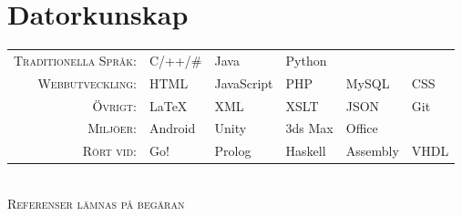 \documentclass[a4paper,10pt]{article}
\begin{document}
\section{Datorkunskap}
\def\arraystretch{1.2}%
\begin{tabu}to \textwidth{r X[c] X[c] X[c] X[c] X[c]}
\textsc{Traditionella Språk:}	&	C/++/\#	&	 Java		&	Python	&			&		\\
\textsc{Webbutveckling:}		&	 HTML		& 	JavaScript	&	PHP		&	MySQL	& 	CSS	\\
\textsc{Övrigt:}			& 	LaTeX		&	XML		&	XSLT		&	JSON		&	 Git	\\
\textsc{Miljöer:}			&	Android	& 	Unity		&	3ds Max	&	Office		&		\\
\textsc{Rört vid: }			&	Go!		&	 Prolog	&	Haskell	&	Assembly	&	 VHDL
\end{tabu}
\\[0.3cm]

\centering\textsc{ Referenser lämnas på begäran}
\end{document}
